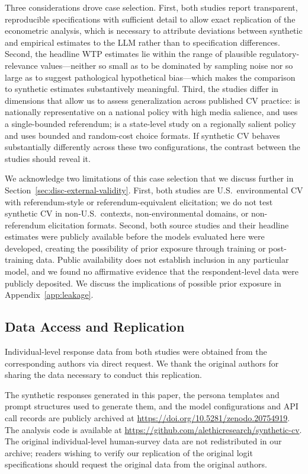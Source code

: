 \documentclass[12pt]{article}
\begin{document}
Three considerations drove case selection. First, both studies report
transparent, reproducible specifications with sufficient detail to allow
exact replication of the econometric analysis, which is necessary to
attribute deviations between synthetic and empirical estimates to the LLM
rather than to specification differences. Second, the headline WTP
estimates lie within the range of plausible regulatory-relevance
values---neither so small as to be dominated by sampling noise nor so
large as to suggest pathological hypothetical bias---which makes the
comparison to synthetic estimates substantively meaningful. Third, the
studies differ in dimensions that allow us to assess generalization
across published CV practice: \textcite{Aldy2012} is nationally
representative on a national policy with high media salience, and uses a
single-bounded referendum; \textcite{Giguere2020} is a state-level study
on a regionally salient policy and uses bounded and random-cost choice
formats. If synthetic CV behaves substantially differently across these
two configurations, the contrast between the studies should reveal it.

We acknowledge two limitations of this case selection that we discuss
further in Section~\ref{sec:disc-external-validity}. First, both studies
are U.S.\ environmental CV with referendum-style or referendum-equivalent
elicitation; we do not test synthetic CV in non-U.S.\ contexts,
non-environmental domains, or non-referendum elicitation formats. Second, both source studies and their headline estimates were publicly
available before the models evaluated here were developed, creating the
possibility of prior exposure through training or post-training data.
Public availability does not establish inclusion in any particular model,
and we found no affirmative evidence that the respondent-level data were
publicly deposited. We discuss the implications of possible prior exposure
in Appendix~\ref{app:leakage}.

\subsection{Data Access and Replication}\label{sec:data-access}

Individual-level response data from both studies were obtained from the corresponding authors via direct request. We thank the original authors for sharing the
data necessary to conduct this replication.

The synthetic responses generated in this paper, the persona templates and prompt structures used to generate them, and the model configurations and API call records are publicly archived at \url{https://doi.org/10.5281/zenodo.20754919}.
The analysis code is available at \url{https://github.com/alethicresearch/synthetic-cv}. The original individual-level human-survey data are not redistributed in our archive;
readers wishing to verify our replication of the original logit specifications should request the original data from the original authors.
\end{document}
